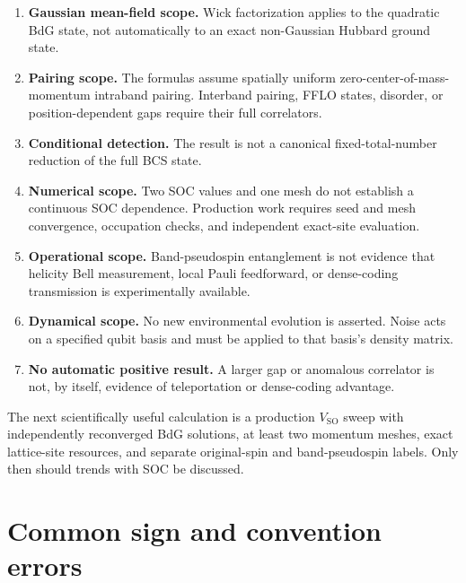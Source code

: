 \documentclass[11pt]{article}
\newcommand{\SO}{V_{\mathrm{SO}}}
\begin{document}
\begin{enumerate}
\item \textbf{Gaussian mean-field scope.} Wick factorization applies to the quadratic BdG state, not automatically to an exact non-Gaussian Hubbard ground state.
\item \textbf{Pairing scope.} The formulas assume spatially uniform zero-center-of-mass-momentum intraband pairing. Interband pairing, FFLO states, disorder, or position-dependent gaps require their full correlators.
\item \textbf{Conditional detection.} The result is not a canonical fixed-total-number reduction of the full BCS state.
\item \textbf{Numerical scope.} Two SOC values and one mesh do not establish a continuous SOC dependence. Production work requires seed and mesh convergence, occupation checks, and independent exact-site evaluation.
\item \textbf{Operational scope.} Band-pseudospin entanglement is not evidence that helicity Bell measurement, local Pauli feedforward, or dense-coding transmission is experimentally available.
\item \textbf{Dynamical scope.} No new environmental evolution is asserted. Noise acts on a specified qubit basis and must be applied to that basis's density matrix.
\item \textbf{No automatic positive result.} A larger gap or anomalous correlator is not, by itself, evidence of teleportation or dense-coding advantage.
\end{enumerate}

The next scientifically useful calculation is a production $\SO$ sweep with independently reconverged BdG solutions, at least two momentum meshes, exact lattice-site resources, and separate original-spin and band-pseudospin labels. Only then should trends with SOC be discussed.

\appendix
\section{Common sign and convention errors}
\label{app:errors}
\end{document}
